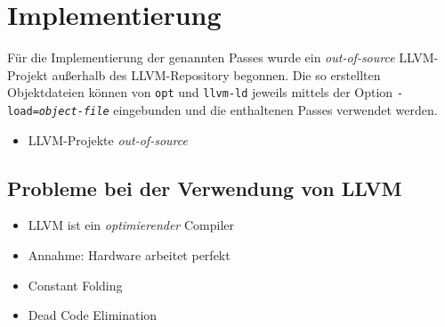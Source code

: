 \section{Implementierung}

Für die Implementierung der genannten Passes wurde ein \emph{out-of-source} LLVM-Pro\-jekt außerhalb
des LLVM-Repository begonnen. Die so erstellten Objektdateien können von
\texttt{opt} und \texttt{llvm-ld} jeweils mittels der Option
\texttt{-load=\textit{object-file}} eingebunden und die enthaltenen Passes
verwendet werden.

\begin{leftbar}
  \begin{itemize}
    \item LLVM-Projekte \emph{out-of-source}
  \end{itemize}
\end{leftbar}

\subsection{Probleme bei der Verwendung von LLVM}

\begin{leftbar}
  \begin{itemize}
    \item LLVM ist ein \emph{optimierender} Compiler
    \item Annahme: Hardware arbeitet perfekt
    \item Constant Folding
    \item Dead Code Elimination
  \end{itemize}
\end{leftbar}
